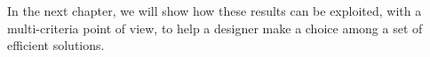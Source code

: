 In the next chapter, we will show how these results can be exploited, with a multi-criteria point of view, to help a designer make a choice among a set of efficient solutions.

%





